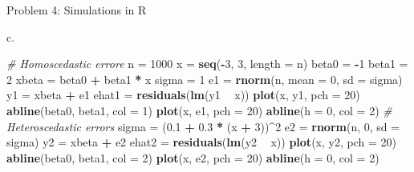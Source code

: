 \documentclass[ignorenonframetext,]{beamer}
\newenvironment{Shaded}{\begin{snugshade}}{\end{snugshade}}
\newcommand{\KeywordTok}[1]{\textcolor[rgb]{0.13,0.29,0.53}{\textbf{#1}}}
\newcommand{\DataTypeTok}[1]{\textcolor[rgb]{0.13,0.29,0.53}{#1}}
\newcommand{\DecValTok}[1]{\textcolor[rgb]{0.00,0.00,0.81}{#1}}
\newcommand{\FloatTok}[1]{\textcolor[rgb]{0.00,0.00,0.81}{#1}}
\newcommand{\StringTok}[1]{\textcolor[rgb]{0.31,0.60,0.02}{#1}}
\newcommand{\CommentTok}[1]{\textcolor[rgb]{0.56,0.35,0.01}{\textit{#1}}}
\newcommand{\OperatorTok}[1]{\textcolor[rgb]{0.81,0.36,0.00}{\textbf{#1}}}
\newcommand{\NormalTok}[1]{#1}
\begin{document}
\begin{frame}[fragile]
\begin{block}{Problem 4: Simulations in R}
\begin{block}{c.}
\begin{Shaded}
\begin{Highlighting}[]
\CommentTok{# Homoscedastic errore}
\NormalTok{n =}\StringTok{ }\DecValTok{1000}
\NormalTok{x =}\StringTok{ }\KeywordTok{seq}\NormalTok{(}\OperatorTok{-}\DecValTok{3}\NormalTok{, }\DecValTok{3}\NormalTok{, }\DataTypeTok{length =}\NormalTok{ n)}
\NormalTok{beta0 =}\StringTok{ }\OperatorTok{-}\DecValTok{1}
\NormalTok{beta1 =}\StringTok{ }\DecValTok{2}
\NormalTok{xbeta =}\StringTok{ }\NormalTok{beta0 }\OperatorTok{+}\StringTok{ }\NormalTok{beta1 }\OperatorTok{*}\StringTok{ }\NormalTok{x}
\NormalTok{sigma =}\StringTok{ }\DecValTok{1}
\NormalTok{e1 =}\StringTok{ }\KeywordTok{rnorm}\NormalTok{(n, }\DataTypeTok{mean =} \DecValTok{0}\NormalTok{, }\DataTypeTok{sd =}\NormalTok{ sigma)}
\NormalTok{y1 =}\StringTok{ }\NormalTok{xbeta }\OperatorTok{+}\StringTok{ }\NormalTok{e1}
\NormalTok{ehat1 =}\StringTok{ }\KeywordTok{residuals}\NormalTok{(}\KeywordTok{lm}\NormalTok{(y1 }\OperatorTok{~}\StringTok{ }\NormalTok{x))}
\KeywordTok{plot}\NormalTok{(x, y1, }\DataTypeTok{pch =} \DecValTok{20}\NormalTok{)}
\KeywordTok{abline}\NormalTok{(beta0, beta1, }\DataTypeTok{col =} \DecValTok{1}\NormalTok{)}
\KeywordTok{plot}\NormalTok{(x, e1, }\DataTypeTok{pch =} \DecValTok{20}\NormalTok{)}
\KeywordTok{abline}\NormalTok{(}\DataTypeTok{h =} \DecValTok{0}\NormalTok{, }\DataTypeTok{col =} \DecValTok{2}\NormalTok{)}
\CommentTok{# Heteroscedastic errors}
\NormalTok{sigma =}\StringTok{ }\NormalTok{(}\FloatTok{0.1} \OperatorTok{+}\StringTok{ }\FloatTok{0.3} \OperatorTok{*}\StringTok{ }\NormalTok{(x }\OperatorTok{+}\StringTok{ }\DecValTok{3}\NormalTok{))}\OperatorTok{^}\DecValTok{2}
\NormalTok{e2 =}\StringTok{ }\KeywordTok{rnorm}\NormalTok{(n, }\DecValTok{0}\NormalTok{, }\DataTypeTok{sd =}\NormalTok{ sigma)}
\NormalTok{y2 =}\StringTok{ }\NormalTok{xbeta }\OperatorTok{+}\StringTok{ }\NormalTok{e2}
\NormalTok{ehat2 =}\StringTok{ }\KeywordTok{residuals}\NormalTok{(}\KeywordTok{lm}\NormalTok{(y2 }\OperatorTok{~}\StringTok{ }\NormalTok{x))}
\KeywordTok{plot}\NormalTok{(x, y2, }\DataTypeTok{pch =} \DecValTok{20}\NormalTok{)}
\KeywordTok{abline}\NormalTok{(beta0, beta1, }\DataTypeTok{col =} \DecValTok{2}\NormalTok{)}
\KeywordTok{plot}\NormalTok{(x, e2, }\DataTypeTok{pch =} \DecValTok{20}\NormalTok{)}
\KeywordTok{abline}\NormalTok{(}\DataTypeTok{h =} \DecValTok{0}\NormalTok{, }\DataTypeTok{col =} \DecValTok{2}\NormalTok{)}
\end{Highlighting}
\end{Shaded}

\end{block}


\end{block}
\end{frame}
\end{document}
